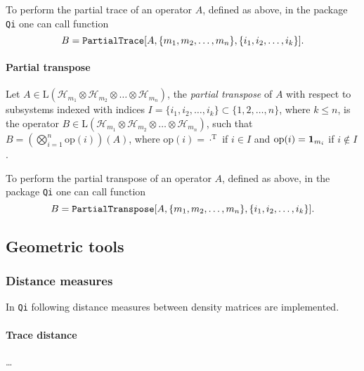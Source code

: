 \documentclass[11pt,a4paper]{article}
\newcommand{\qi}{\texttt{Qi}}
\newcommand{\Hilb}[1]{\mathcal{H}_{#1}}
\newcommand{\Lin}{\mathrm{L}}
\newcommand{\1}{{\bf 1}}
\newcommand{\fname}[1]{\text{\texttt{#1}}}
\begin{document}
To perform the partial trace of an operator $A$, defined as above, in the
package \qi{} one can call function
\begin{equation}
B=\fname{PartialTrace}[A, \{m_1, m_2, \ldots, m_n\}, \{i_1, i_2, 
\ldots, i_k\}].
\end{equation} 

\paragraph{Partial transpose}
Let $A\in \Lin(\Hilb{m_1}\otimes \Hilb{m_2}\otimes \ldots \otimes \Hilb{m_n})$,
the \emph{partial transpose} of $A$ with respect to subsystems indexed with
indices $I=\{i_1, i_2, \ldots, i_k\}\subset \{1,2,\ldots, n\}$, where $k\leq n$,
is the operator $B\in \Lin(\Hilb{m_1}\otimes \Hilb{m_2}\otimes \ldots \otimes
\Hilb{m_n})$, such that $B=(\bigotimes_{i=1}^{n} \mathrm{op}(i))(A)$, where
$\mathrm{op}(i)=\cdot^{\mathrm T}$ if $i\in I$ and $\mathrm{op}(i)=\1_{m_i}$ if
$i\notin I$.

To perform the partial transpose of an operator $A$, defined as above, in the
package \qi{} one can call function
\begin{equation}
B=\fname{PartialTranspose}[A, \{m_1, m_2, \ldots, m_n\}, \{i_1, i_2, 
\ldots, i_k\}].
\end{equation} 

\subsection{Geometric tools}

\subsubsection{Distance measures}
In \qi{} following distance measures between density matrices are implemented.

\paragraph{Trace distance} \ldots 
\end{document}
